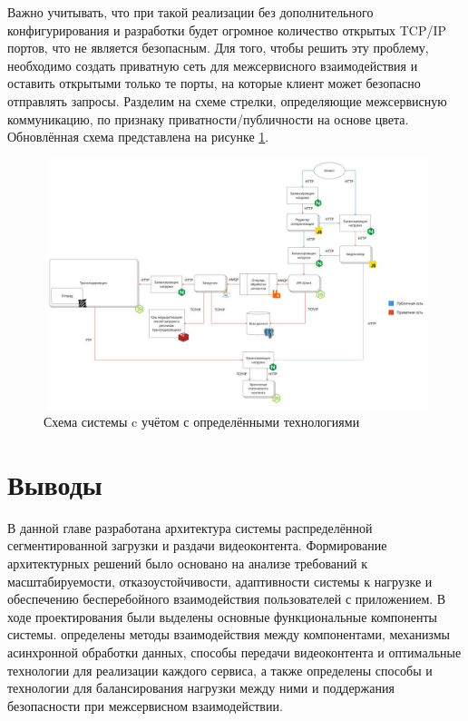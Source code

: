 	Важно учитывать, что при такой реализации без дополнительного конфигурирования и разработки будет огромное количество открытых TCP/IP портов, что не является безопасным. Для того, чтобы решить эту проблему, необходимо создать приватную сеть для межсервисного взаимодействия и оставить открытыми только те порты, на которые клиент может безопасно отправлять запросы. Разделим на схеме стрелки, определяющие межсервисную коммуникацию, по признаку приватности/публичности на основе цвета. Обновлённая схема представлена на рисунке \ref{fig:system_scheme_7}.

	\begin{figure}[ht!] 
		\center
		\includegraphics [scale=0.37] {my_folder/images//system_scheme_7}
		\caption{Схема системы c учётом с определёнными технологиями} 
		\label{fig:system_scheme_7}  
	\end{figure}
	
\section{Выводы}

	В данной главе разработана архитектура системы распределённой сегментированной загрузки и раздачи видеоконтента. Формирование архитектурных решений было основано на анализе требований к масштабируемости, отказоустойчивости, адаптивности системы к нагрузке и обеспечению бесперебойного взаимодействия пользователей с приложением. В ходе проектирования были выделены основные функциональные компоненты системы. определены методы взаимодействия между компонентами, механизмы асинхронной обработки данных, способы передачи видеоконтента и оптимальные технологии для реализации каждого сервиса, а также определены способы и технологии для балансирования нагрузки между ними и поддержания безопасности при межсервисном взаимодействии.
	
